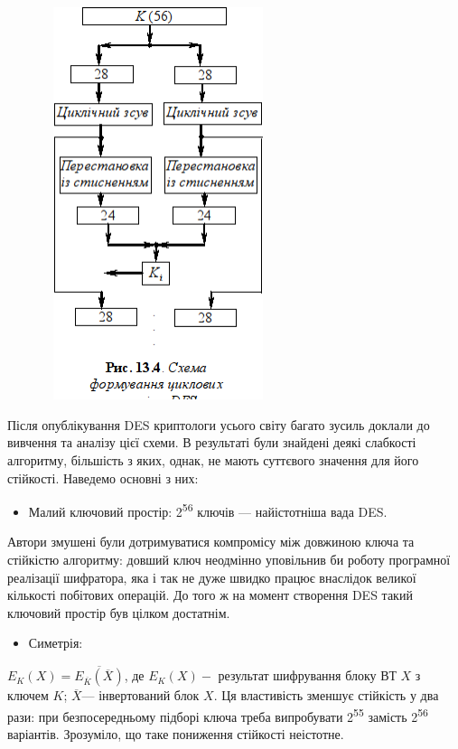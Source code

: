 \begin{figure}
\centering
\includegraphics[width=2.6492in,height=4.5236in]{crypt-img/crypt-img297.png}
\end{figure}
Після опублікування DES  криптологи усього світу багато зусиль доклали  до
вивчення та аналізу цієї схеми. В результаті були знайдені деякі слабкості
алгоритму, більшість з яких, однак, не мають суттєвого значення для його
стійкості. Наведемо основні з них:

\liststyleWWviiiNumxlix
\begin{itemize}
\item Малий ключовий простір: 2\textsuperscript{56} ключів --- найістотніша вада
DES. 
\end{itemize}
Автори змушені були дотримуватися компромісу між довжиною ключа та стійкістю
алгоритму: довший ключ неодмінно уповільнив би роботу програмної реалізації
шифратора, яка і так не дуже швидко працює внаслідок великої кількості
побітових операцій. До того ж на момент створення DES такий ключовий простір
був цілком достатнім.

\liststyleWWviiiNumxlix
\begin{itemize}
\item Симетрія:
\end{itemize}
 ${E_{{K}}(X)=\overline{{E_{{\overline{{K}}}}(\overline{{X}})}}}$, де 
${E_{{K}}(X)-}$ результат шифрування блоку ВТ  ${X}$ з ключем  ${K}$; 
${\overline{{X}}}$--- інвертований блок  ${X}$. Ця властивість зменшує стійкість
у два рази: при безпосередньому підборі ключа треба випробувати
2\textsuperscript{55} замість 2\textsuperscript{56} варіантів. Зрозуміло, що
таке пониження стійкості неістотне.

